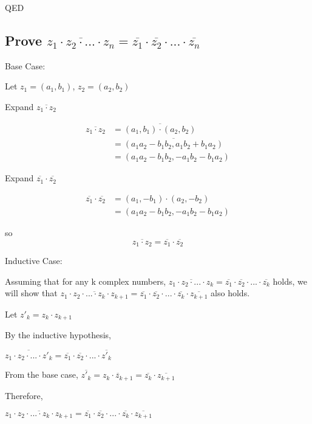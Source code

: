 \documentclass[11pt]{article}
\begin{document}
QED

\subsection*{Prove \(\overline{z_1 \cdot z_2 \cdot ... \cdot z_n} = \overline{z_1} \cdot \overline{z_2} \cdot ... \cdot \overline{z_n}\)}
\label{sec:org8630e47}
Base Case:

Let \(z_1 = (a_1, b_1)\), \(z_2 = (a_2, b_2)\)

Expand \(\overline{z_1 \cdot z_2}\)

\begin{align*} 
\overline{z_1 \cdot z_2} &= \overline{(a_1, b_1) \cdot (a_2, b_2)} \\
                         &= \overline{(a_1a_2 - b_1b_2, a_1b_2 + b_1a_2)} \\
                         &= (a_1a_2 - b_1b_2, -a_1b_2 - b_1a_2)
\end{align*}

Expand \(\overline{z_1} \cdot \overline{z_2}\)

\begin{align*}
\overline{z_1} \cdot \overline{z_2} &= (a_1, -b_1) \cdot (a_2, -b_2) \\
                                    &= (a_1a_2 - b_1b_2, -a_1b_2 - b_1a_2)
\end{align*}

so \[ \overline{z_1 \cdot z_2} = \overline{z_1} \cdot \overline{z_2} \]

Inductive Case:

Assuming that for any k complex numbers, \(\overline{z_1 \cdot z_2 \cdot ... \cdot z_k} = \overline{z_1} \cdot \overline{z_2} \cdot ... \cdot \overline{z_k}\) holds, we will show that \(\overline{z_1 \cdot z_2 \cdot ... \cdot z_k \cdot z_{k+1}} = \overline{z_1} \cdot \overline{z_2} \cdot ... \cdot \overline{z_k} \cdot \overline{z_{k+1}}\) also holds.

Let \(z'_k = z_k \cdot z_{k+1}\)

By the inductive hypothesis,

\(\overline{z_1 \cdot z_2 \cdot ... \cdot z'_k} = \overline{z_1} \cdot \overline{z_2} \cdot ... \cdot \overline{z'_k}\)

From the base case, \(\overline{z'_k} = \overline{z_k \cdot z_{k+1}} = \overline{z_k} \cdot \overline{z_{k+1}}\)

Therefore,

\(\overline{z_1 \cdot z_2 \cdot ... \cdot z_k \cdot z_{k+1}} = \overline{z_1} \cdot \overline{z_2} \cdot ... \cdot \overline{z_k} \cdot \overline{z_{k+1}}\)
\end{document}
